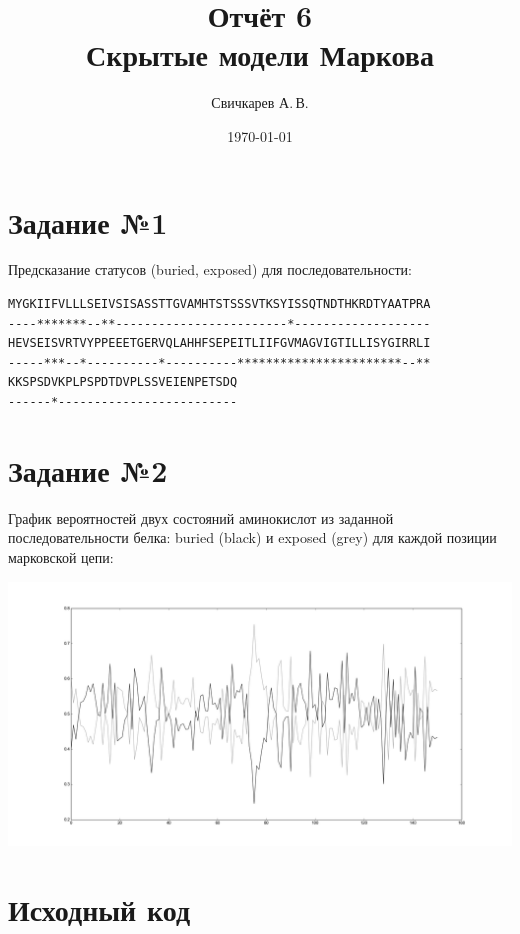 \documentclass{article} %
\title{Отчёт 6\protect\\Скрытые модели Маркова} %
\author{Свичкарев А.\,В.} %
\date{\today} %
\begin{document}

\maketitle %

\section{Задание №1}
Предсказание статусов (buried, exposed) для последовательности:

\begin{verbatim}
MYGKIIFVLLLSEIVSISASSTTGVAMHTSTSSSVTKSYISSQTNDTHKRDTYAATPRA
----*******--**------------------------*-------------------
HEVSEISVRTVYPPEEETGERVQLAHHFSEPEITLIIFGVMAGVIGTILLISYGIRRLI
-----***--*----------*----------***********************--**
KKSPSDVKPLPSPDTDVPLSSVEIENPETSDQ
------*-------------------------
\end{verbatim}

\section{Задание №2}
График вероятностей двух состояний аминокислот из заданной последовательности белка: buried (black) и exposed (grey) для каждой позиции марковской цепи:

\includegraphics[width=\textwidth]{figure_1}

\section{Исходный код}

\end{document}
